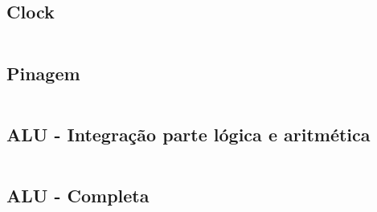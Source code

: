 \inputminted{vhdl}{./.vhdl/aritm.vhdl}

\subsection{ Clock\newline}  \label{ap:7.7}

\inputminted{vhdl}{./.vhdl/clock.vhdl}

\subsection{ Pinagem\newline}  \label{ap:7.8}

\inputminted{vhdl}{./.vhdl/pin.vhdl}

\subsection{ ALU - Integração parte lógica e aritmética\newline}  \label{ap:7.9}

\inputminted{vhdl}{./.vhdl/alufull.vhdl}

\subsection{ ALU - Completa\newline}  \label{ap:7.10}

\inputminted{vhdl}{./.vhdl/alumain.vhdl}





